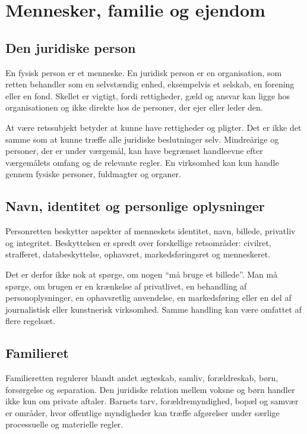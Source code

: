 \chapter{Mennesker, familie og ejendom}


\section{Den juridiske person}

En fysisk person er et menneske. En juridisk person er en organisation, som retten behandler som en selvstændig enhed, eksempelvis et selskab, en forening eller en fond. Skellet er vigtigt, fordi rettigheder, gæld og ansvar kan ligge hos organisationen og ikke direkte hos de personer, der ejer eller leder den.

At være retssubjekt betyder at kunne have rettigheder og pligter. Det er ikke det samme som at kunne træffe alle juridiske beslutninger selv. Mindreårige og personer, der er under værgemål, kan have begrænset handleevne efter værgemålets omfang og de relevante regler. En virksomhed kan kun handle gennem fysiske personer, fuldmagter og organer.

\section{Navn, identitet og personlige oplysninger}

Personretten beskytter aspekter af menneskets identitet, navn, billede, privatliv og integritet. Beskyttelsen er spredt over forskellige retsområder: civilret, strafferet, databeskyttelse, ophavsret, markedsføringsret og menneskeret.

Det er derfor ikke nok at spørge, om nogen ``må bruge et billede''. Man må spørge, om brugen er en krænkelse af privatlivet, en behandling af personoplysninger, en ophavsretlig anvendelse, en markedsføring eller en del af journalistisk eller kunstnerisk virksomhed. Samme handling kan være omfattet af flere regelsæt.

\section{Familieret}

Familieretten regulerer blandt andet ægteskab, samliv, forældreskab, børn, forsørgelse og separation. Den juridiske relation mellem voksne og børn handler ikke kun om private aftaler. Barnets tarv, forældremyndighed, bopæl og samvær er områder, hvor offentlige myndigheder kan træffe afgørelser under særlige processuelle og materielle regler.

